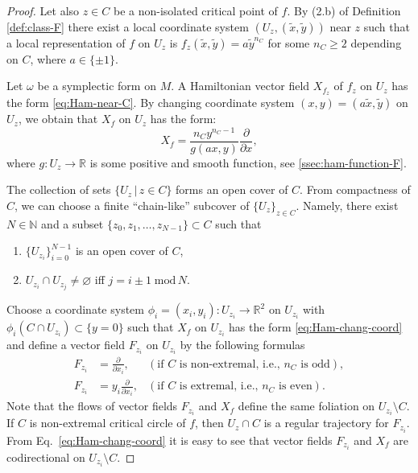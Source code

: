 \documentclass[10pt,reqno]{amsart}
\newcommand{\bbR}{\mathbb{R}}
\newcommand{\bbN}{\mathbb{N}}
\begin{document}
\begin{proof}
Let also $z\in C$ be a non-isolated critical point of $f$. By (2.b) of Definition \ref{def:class-F} there exist a local coordinate system $(U_z, (\tilde{x},\tilde{y}))$ near $z$ such that a local representation of $f$ on $U_z$ is $f_z(\tilde{x},\tilde{y}) = a \tilde{y}^{n_C}$ for  some $n_C\geq 2$ depending on $C$, where $a \in \{ \pm 1\}$.

Let $\omega$ be a symplectic form on $M$.
 A Hamiltonian vector field $X_{f_z}$ of $f_z$ on $U_z$ has the form \eqref{eq:Ham-near-C}. By changing coordinate system $(x,y)= (a\tilde{x},\tilde{y})$ on $U_z$, we obtain that $X_f$ on $U_z$ has the form:
\begin{equation}\label{eq:Ham-chang-coord}
	X_f = \frac{n_Cy^{n_C-1}}{{g}(a x,y)}\frac{\partial}{\partial x},
\end{equation}
where $g:U_z\to \bbR$ is some positive and smooth function, see \textsection\ref{ssec:ham-function-F}.

The collection of sets $\{U_z\,|\,z\in C \}$ forms an open cover of $C$. From compactness of $C$, we can choose a finite ``chain-like'' subcover of $\{U_z\}_{z\in C}$. Namely,  
there exist $N\in \bbN$ and a subset $\{z_0, z_1,\ldots, z_{N-1}\}\subset C$ such that
\begin{enumerate}
	\item $\{U_{z_i}\}_{i = 0}^{N-1}$ is an open cover of $C$,
	\item $U_{z_i}\cap U_{z_j}\neq \varnothing$ iff $j = i\pm 1\;\mathrm{mod}\, N$.  
\end{enumerate}
{Choose a coordinate system $\phi_i = (x_i, y_i):U_{z_i}\to\mathbb{R}^2$ on $U_{z_i}$ with $\phi_i(C\cap U_{z_i})\subset \{y = 0\}$} such that  $X_f$ on $U_{z_i}$ has the form \eqref{eq:Ham-chang-coord} and
define a vector field $F_{z_i}$ on $U_{z_i}$ by the following formulas
\begin{align}
	F_{z_i} &= \frac{\partial}{\partial x_i}, &(\text{if $C$ is non-extremal, i.e., $n_C$ is odd}), \label{eq:F_z-C-non-extr}\\
	F_{z_i} &= y_i\frac{\partial}{\partial x_i}, &(\text{if $C$ is extremal, i.e., $n_C$ is even}). \label{eq:F_z-C-extr}
\end{align}
Note that the flows of vector fields $F_{z_i}$ and $X_f$ define the same foliation on $U_{z_i}\setminus C$.
If $C$ is non-extremal critical circle of $f$, then $U_z\cap C$ is a regular trajectory for $F_{z_i}$. 
From Eq.~\eqref{eq:Ham-chang-coord} it is easy to see that vector fields $F_{z_i}$  and $X_f$ are codirectional on $U_{z_i}\setminus C$.



\end{proof}
\end{document}
